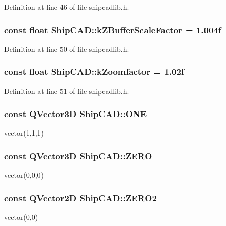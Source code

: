Definition at line 46 of file shipcadlib.\+h.

\subsubsection[{\texorpdfstring{k\+Z\+Buffer\+Scale\+Factor}{kZBufferScaleFactor}}]{\setlength{\rightskip}{0pt plus 5cm}const float Ship\+C\+A\+D\+::k\+Z\+Buffer\+Scale\+Factor = 1.\+004f}\hypertarget{namespaceShipCAD_a519c591e5f5e3f60603b3133a4a2094e}{}\label{namespaceShipCAD_a519c591e5f5e3f60603b3133a4a2094e}


Definition at line 50 of file shipcadlib.\+h.

\subsubsection[{\texorpdfstring{k\+Zoomfactor}{kZoomfactor}}]{\setlength{\rightskip}{0pt plus 5cm}const float Ship\+C\+A\+D\+::k\+Zoomfactor = 1.\+02f}\hypertarget{namespaceShipCAD_a80babe3fef93f1117e1c410f8d3c22c2}{}\label{namespaceShipCAD_a80babe3fef93f1117e1c410f8d3c22c2}


Definition at line 51 of file shipcadlib.\+h.

\subsubsection[{\texorpdfstring{O\+NE}{ONE}}]{\setlength{\rightskip}{0pt plus 5cm}const Q\+Vector3D Ship\+C\+A\+D\+::\+O\+NE}\hypertarget{namespaceShipCAD_ad454d484187a50b115d2e77055617816}{}\label{namespaceShipCAD_ad454d484187a50b115d2e77055617816}
vector(1,1,1) 
\subsubsection[{\texorpdfstring{Z\+E\+RO}{ZERO}}]{\setlength{\rightskip}{0pt plus 5cm}const Q\+Vector3D Ship\+C\+A\+D\+::\+Z\+E\+RO}\hypertarget{namespaceShipCAD_a949bc53a1634b268b43de672807480fb}{}\label{namespaceShipCAD_a949bc53a1634b268b43de672807480fb}
vector(0,0,0) 
\subsubsection[{\texorpdfstring{Z\+E\+R\+O2}{ZERO2}}]{\setlength{\rightskip}{0pt plus 5cm}const Q\+Vector2D Ship\+C\+A\+D\+::\+Z\+E\+R\+O2}\hypertarget{namespaceShipCAD_ab47218dccdf4c94d5989b2e5b13d8603}{}\label{namespaceShipCAD_ab47218dccdf4c94d5989b2e5b13d8603}
vector(0,0) 